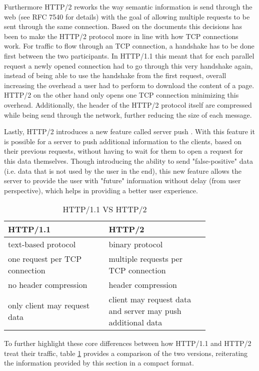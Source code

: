 \documentclass[conference]{IEEEtran}
\begin{document}
Furthermore HTTP/2 reworks the way semantic information is send through the web (see RFC 7540 \cite{rfc7540} for details) with the goal of allowing multiple requests to be sent through the same connection. Based on the documents \cite{rfc7540} \cite{httpwgHTTP2} this decisions has been to make the HTTP/2 protocol more in line with how TCP connections work. For traffic to flow through an TCP connection, a handshake has to be done first between the two participants. In HTTP/1.1 this meant that for each parallel request a newly opened connection had to go through this very handshake again, instead of being able to use the handshake from the first request, overall increasing the overhead a user had to perform to download the content of a page. HTTP/2 on the other hand only opens one TCP connection minimizing this overhead. Additionally, the header of the HTTP/2 protocol itself are compressed while being send through the network, further reducing the size of each message.

Lastly, HTTP/2 introduces a new feature called server push \cite{rfc7540}. With this feature it is possible for a server to push additional information to the clients, based on their previous requests, without having to wait for them to open a request for this data themselves. Though introducing the ability to send "false-positive" data (i.e. data that is not used by the user in the end), this new feature allows the server to provide the user with "future" information without delay (from user perspective), which helps in providing a better user experience.

\begin{table}[!htbp]
	\centering
	\caption{HTTP/1.1 VS HTTP/2}
	\label{http2comparison}
	\begin{tabular}{| p{0.4\linewidth} | p{0.4\linewidth}|}\hline
		HTTP/1.1 & HTTP/2 \\\hline
		text-based protocol & binary protocol \\\hline
		one request per TCP connection & multiple requests per TCP connection \\\hline
		no header compression & header compression \\\hline
		only client may request data & client may request data and server may push additional data \\\hline
	\end{tabular}
\end{table}

To further highlight these core differences between how HTTP/1.1 and HTTP/2 treat their traffic, table \ref{http2comparison} provides a comparison of the two versions, reiterating the information provided by this section in a compact format.
\end{document}
